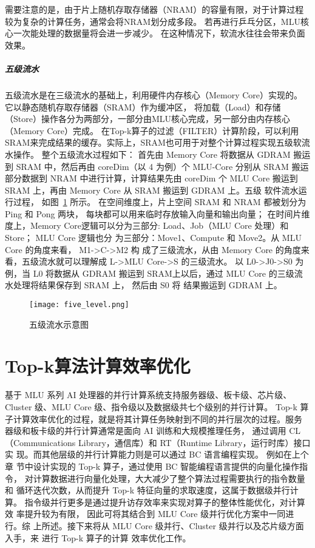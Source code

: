 需要注意的是，由于片上随机存取存储器（NRAM）的容量有限，对于计算过程较为复杂的计算任务，通常会将NRAM划分成多段。
若再进行乒乓分区，MLU核心一次能处理的数据量将会进一步减少。
在这种情况下，软流水往往会带来负面效果。

\subparagraph{五级流水}

五级流水是在三级流水的基础上，利用硬件内存核心（Memory Core）实现的。它以静态随机存取存储器（SRAM）作为缓冲区，
将加载（Load）和存储（Store）操作各分为两部分，一部分由MLU核心完成，另一部分由内存核心（Memory Core）完成。
在Top-k算子的过滤（FILTER）计算阶段，可以利用SRAM来完成结果的缓存。实际上，SRAM也可用于对整个计算过程实现五级软流水操作。
整个五级流水过程如下：
首先由 Memory Core 将数据从 GDRAM 搬运到 SRAM 中，然后再由 coreDim（以 4 为例）个 MLU-Core 分别从 
SRAM 搬运部分数据到 NRAM 中进行计算，计算结果先由 coreDim 个 MLU Core 搬运到 SRAM 上，再由 Memory Core 从 
SRAM 搬运到 GDRAM 上。五级 软件流水运行过程，
如图~\ref{fig:five_level} 所示。
在空间维度上，片上空间 SRAM 和 NRAM 都被划分为 Ping 和 Pong 两块， 每块都可以用来临时存放输入向量和输出向量；
在时间片维度上，Memory Core逻辑可以分为三部分: Load、Job（MLU Core 处理）和 Store；
MLU Core 逻辑也分 为三部分：Move1、Compute 和 Move2。从 MLU Core 的角度来看，
M1->C->M2 构 成了三级流水，从由 Memory Core 的角度来看，五级流水就可以理解成 L->MLU Core->S 的三级流水。
以 L0->J0->S0 为例，当 L0 将数据从 GDRAM 搬运到 SRAM上以后，通过 MLU Core 的三级流水处理将结果保存到 SRAM 上，
然后由 S0 将 结果搬运到 GDRAM 上。
\begin{figure}[ht]
    \centering
    \texttt{[image: five\_level.png]}
    \caption{五级流水示意图}
    \label{fig:five_level}
\end{figure}





\section{Top-k算法计算效率优化}
基于 MLU 系列 AI 处理器的并行计算系统支持服务器级、板卡级、芯片级、Cluster 级、MLU Core 级、指令级以及数据级共七个级别的并行计算。
Top-k 算 子计算效率优化的过程，就是将其计算任务映射到不同的并行层次的过程。服务 器级和板卡级的并行计算通常是面向 AI 训练和大规模推理任务，
通过调用 CL（Communications Library，通信库）和 RT（Runtime Library，运行时库）接口实 现。而其他层级的并行计算能力则是可以通过 BC 语言编程实现。
例如在上个章 节中设计实现的 Top-k 算子，通过使用 BC 智能编程语言提供的向量化操作指令， 对计算数据进行向量化处理，大大减少了整个算法过程需要执行的指令数量和
 循环迭代次数，从而提升 Top-k 特征向量的求取速度，这属于数据级并行计算。 指令级并行更多是通过提升访存效率来实现对算子的整体性能优化，对计算效 率提升较为有限，
 因此可将其结合到 MLU Core 级并行优化方案中一同进行。综 上所述。接下来将从 MLU Core 级并行、Cluster 级并行以及芯片级方面入手，来 进行 Top-k 算子的计算
 效率优化工作。

